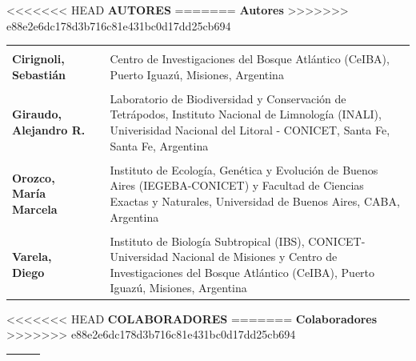 \documentclass[
  x11names]{article}
\begin{document}
<<<<<<< HEAD
\textbf{AUTORES}
=======
\textbf{Autores}
>>>>>>> e88e2e6dc178d3b716c81e431bc0d17dd25cb694

\begin{tabu} to 
\toprule
\textbf{} &  & \\
\textbf{Cirignoli, Sebastián} &  & Centro de Investigaciones del Bosque Atlántico (CeIBA), Puerto Iguazú, Misiones, Argentina\\
\textbf{} &  & \\
\textbf{Giraudo, Alejandro R.} &  & Laboratorio de Biodiversidad y Conservación de Tetrápodos, Instituto Nacional de Limnología (INALI), Univerisidad Nacional del Litoral - CONICET, Santa Fe, Santa Fe, Argentina\\
\textbf{} &  & \\
\addlinespace
\textbf{Orozco, María Marcela} &  & Instituto de Ecología, Genética y Evolución de Buenos Aires (IEGEBA-CONICET) y Facultad de Ciencias Exactas y Naturales, Universidad de Buenos Aires, CABA, Argentina\\
\textbf{} &  & \\
\textbf{Varela, Diego} &  & Instituto de Biología Subtropical (IBS), CONICET-Universidad Nacional de Misiones y Centro de Investigaciones del Bosque Atlántico (CeIBA), Puerto Iguazú, Misiones, Argentina\\
\bottomrule
\end{tabu}

<<<<<<< HEAD
\textbf{COLABORADORES}
=======
\textbf{Colaboradores}
>>>>>>> e88e2e6dc178d3b716c81e431bc0d17dd25cb694

\begin{tabu} to 
\toprule
\textbf{} &  & \\
\bottomrule
\end{tabu}
\end{document}
